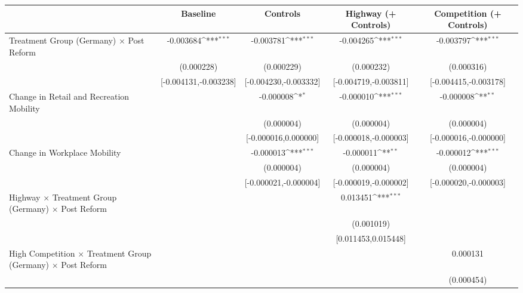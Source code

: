 {
\def\sym#1{\ifmmode^{#1}\else\(^{#1}\)\fi}
\begin{tabular}{l*{4}{c}}
\toprule
                    &\multicolumn{1}{c}{Baseline}&\multicolumn{1}{c}{Controls}&\multicolumn{1}{c}{Highway (+ Controls)}&\multicolumn{1}{c}{Competition (+ Controls)}\\
\midrule
Treatment Group (Germany) $\times$ Post Reform&   -0.003684\sym{***}&   -0.003781\sym{***}&   -0.004265\sym{***}&   -0.003797\sym{***}\\
                    &  (0.000228)         &  (0.000229)         &  (0.000232)         &  (0.000316)         \\
                    &[-0.004131,-0.003238]         &[-0.004230,-0.003332]         &[-0.004719,-0.003811]         &[-0.004415,-0.003178]         \\
Change in Retail and Recreation Mobility&                     &   -0.000008\sym{*}  &   -0.000010\sym{***}&   -0.000008\sym{**} \\
                    &                     &  (0.000004)         &  (0.000004)         &  (0.000004)         \\
                    &                     &[-0.000016,0.000000]         &[-0.000018,-0.000003]         &[-0.000016,-0.000000]         \\
Change in Workplace Mobility&                     &   -0.000013\sym{***}&   -0.000011\sym{**} &   -0.000012\sym{***}\\
                    &                     &  (0.000004)         &  (0.000004)         &  (0.000004)         \\
                    &                     &[-0.000021,-0.000004]         &[-0.000019,-0.000002]         &[-0.000020,-0.000003]         \\
Highway $\times$ Treatment Group (Germany) $\times$ Post Reform&                     &                     &    0.013451\sym{***}&                     \\
                    &                     &                     &  (0.001019)         &                     \\
                    &                     &                     &[0.011453,0.015448]         &                     \\
High Competition $\times$ Treatment Group (Germany) $\times$ Post Reform&                     &                     &                     &    0.000131         \\
                    &                     &                     &                     &  (0.000454)         \\

\end{tabular}}
